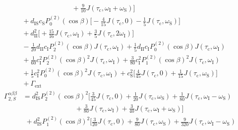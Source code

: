 \begin{appendixtext}
\begin{equation*}
\begin{split}
&\hspace{90pt}+\frac{9}{10}J\left(\tau_{\text{c}},\omega_{\text{I}}+\omega_{\text{S}}\right)\bigg] \\
&\hspace{4pt}+d_{\text{IS}}c_{\text{S}}P_0^{(2)}(\cos\beta)\bigg[-\frac{4}{15}J\left(\tau_{\text{c}},0\right)-\frac{1}{5}J\left(\tau_{\text{c}},\omega_{\text{S}}\right)\bigg] \\
&\hspace{4pt}+d_{\text{II}}^2\bigg[+\frac{15}{16}J\left(\tau_{\text{c}},\omega_{\text{I}}\right)+\frac{3}{5}J\left(\tau_{\text{c}},2\omega_{\text{I}}\right)\bigg] \\
&\hspace{4pt}- \frac{1}{20} d_{\text{II}}c_{\text{I}}P_2^{(2)}(\cos\beta) J\left(\tau_{\text{c}},\omega_{\text{I}}\right)+ \frac{1}{5} d_{\text{II}}c_{\text{I}}P_0^{(2)}(\cos\beta) J\left(\tau_{\text{c}},\omega_{\text{I}}\right) \\ 
&\hspace{4pt}+\frac{1}{60} c_{\text{I}}^2P_2^{(2)}(\cos\beta)^2 J\left(\tau_{\text{c}},\omega_{\text{I}}\right)+\frac{3}{80} c_{\text{I}}^2P_1^{(2)}(\cos\beta)^2 J\left(\tau_{\text{c}},\omega_{\text{I}}\right) \\
&\hspace{4pt}+\frac{1}{5} c_{\text{I}}^2P_0^{(2)}(\cos\beta)^2J\left(\tau_{\text{c}},\omega_{\text{I}}\right)+c_{\text{S}}^2\bigg[\frac{4}{45}J\left(\tau_{\text{c}},0\right)+\frac{1}{15}J(\tau_{\text{c}},\omega_{\text{S}})\bigg]\\
&\hspace{4pt} +\Gamma_{\text{ext}}
\end{split}
\end{equation*}
\begin{equation*}
\begin{split}
\Gamma_{2,S}^{\alpha\beta\beta}&=d_{\text{IS}}^2P_2^{(2)}(\cos\beta)^2\bigg[\frac{3}{45}J\left(\tau_{\text{c}},0\right) + \frac{1}{20}J\left(\tau_{\text{c}},\omega_{\text{S}}\right)
+ \frac{1}{80}J\left(\tau_{\text{c}},\omega_{\text{I}}-\omega_{\text{S}}\right)\\
&\hspace{90pt}+\frac{3}{80}J\left(\tau_{\text{c}},\omega_{\text{I}}\right)+\frac{3}{40}J\left(\tau_{\text{c}},\omega_{\text{I}}+\omega_{\text{S}}\right)\bigg] \\
&\hspace{4pt}+d_{\text{IS}}^2P_1^{(2)}(\cos\beta)^2\bigg[\frac{3}{20}J\left(\tau_{\text{c}},0\right)+ \frac{9}{80}J\left(\tau_{\text{c}},\omega_{\text{S}}\right) + \frac{9}{320}J\left(\tau_{\text{c}},\omega_{\text{I}}-\omega_{\text{S}}\right)\\

\end{split}
\end{equation*}
\end{appendixtext}
